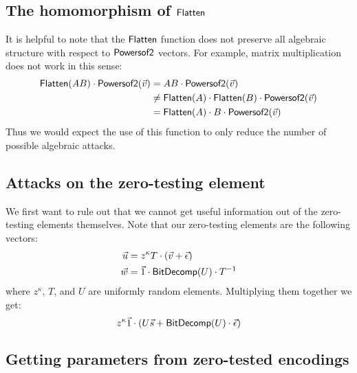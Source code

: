 \subsection{The homomorphism of $\mathsf{Flatten}$}

It is helpful to note that the $\mathsf{Flatten}$ function does not preserve all algebraic structure with respect to $\mathsf{Powersof2}$ vectors.  For example, matrix multiplication does not work in this sense:
\begin{align*}
\mathsf{Flatten}(AB)\cdot \mathsf{Powersof2}(\vec{v}) &= AB \cdot \mathsf{Powersof2}(\vec{v})\\
&\not= \mathsf{Flatten}(A)\cdot \mathsf{Flatten}(B)\cdot \mathsf{Powersof2}(\vec{v})\\ 
&= \mathsf{Flatten}(A)\cdot B\cdot \mathsf{Powersof2}(\vec{v})
\end{align*}
Thus we would expect the use of this function to only reduce the number of possible algebraic attacks.

\subsection{Attacks on the zero-testing element}

We first want to rule out that we cannot get useful information out of the zero-testing elements themselves.  Note that our zero-testing elements are the following vectors:
\begin{align*}
\vec{u} &= z^\kappa T\cdot (\vec{v} + \vec{\epsilon})\\
\vec{w} &= \vec{1}\cdot\mathsf{BitDecomp}(U)\cdot T^{-1}
\end{align*}
where $z^\kappa$, $T$, and $U$ are uniformly random elements.  Multiplying them together we get:
$$z^\kappa \vec{1}\cdot (U\vec{s} + \mathsf{BitDecomp}(U)\cdot\vec{\epsilon})$$

\subsection{Getting parameters from zero-tested encodings}

